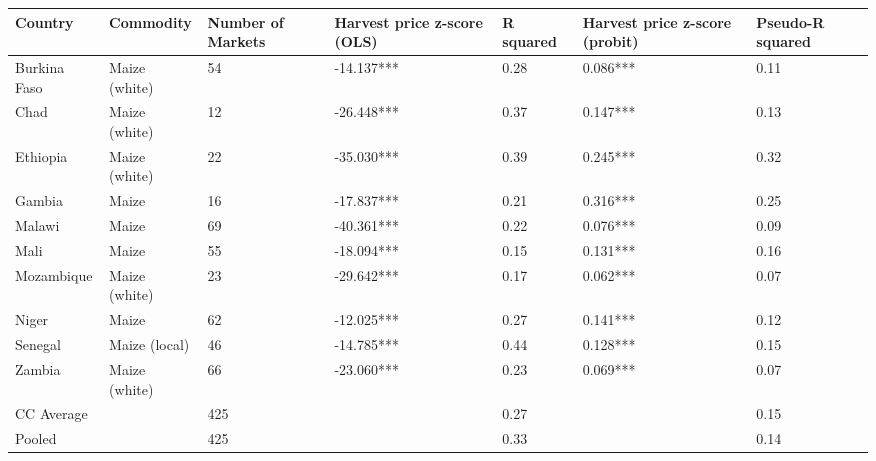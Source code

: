 \begin{table}[ht]
\centering
\begin{tabular}{lllllll}
  \hline
Country & Commodity & Number of Markets & Harvest price z-score (OLS) & R squared & Harvest price z-score (probit) & Pseudo-R squared \\ 
  \hline
Burkina Faso & Maize (white) & 54 & -14.137*** & 0.28 & 0.086*** & 0.11 \\ 
  Chad & Maize (white) & 12 & -26.448*** & 0.37 & 0.147*** & 0.13 \\ 
  Ethiopia & Maize (white) & 22 & -35.030*** & 0.39 & 0.245*** & 0.32 \\ 
  Gambia & Maize & 16 & -17.837*** & 0.21 & 0.316*** & 0.25 \\ 
  Malawi & Maize & 69 & -40.361*** & 0.22 & 0.076*** & 0.09 \\ 
  Mali & Maize & 55 & -18.094*** & 0.15 & 0.131*** & 0.16 \\ 
  Mozambique & Maize (white) & 23 & -29.642*** & 0.17 & 0.062*** & 0.07 \\ 
  Niger & Maize & 62 & -12.025*** & 0.27 & 0.141*** & 0.12 \\ 
  Senegal & Maize (local) & 46 & -14.785*** & 0.44 & 0.128*** & 0.15 \\ 
  Zambia & Maize (white) & 66 & -23.060*** & 0.23 & 0.069*** & 0.07 \\ 
  CC Average &  & 425 &  & 0.27 &  & 0.15 \\ 
  Pooled &  & 425 &  & 0.33 &  & 0.14 \\ 
   \hline
\end{tabular}
\end{table}
